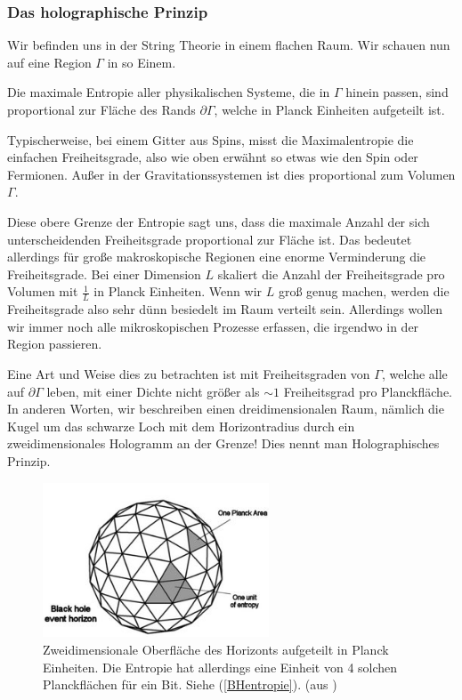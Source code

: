 \documentclass[ngerman]{scrartcl}
\begin{document}
	\subsubsection{Das holographische Prinzip}
	Wir befinden uns in der String Theorie in einem flachen Raum. Wir schauen nun auf eine Region $\Gamma$ in so Einem. 
	
	Die maximale Entropie aller physikalischen Systeme, die in $\Gamma$ hinein passen, sind proportional zur Fläche des Rands $\partial \Gamma$, welche in Planck Einheiten aufgeteilt ist. 
	
	Typischerweise, bei einem Gitter aus Spins, misst die Maximalentropie die einfachen Freiheitsgrade, also wie oben erwähnt so etwas wie den Spin oder Fermionen. Außer in der Gravitationssystemen ist dies proportional zum Volumen $\Gamma$. 
	
	Diese obere Grenze der Entropie sagt uns, dass die maximale Anzahl der sich unterscheidenden Freiheitsgrade proportional zur Fläche ist. Das bedeutet allerdings für große makroskopische Regionen eine enorme Verminderung die Freiheitsgrade. Bei einer Dimension $L$ skaliert die Anzahl der Freiheitsgrade pro Volumen mit $\frac{1}{L}$ in Planck Einheiten.
	Wenn wir $L$ groß genug machen, werden die Freiheitsgrade also sehr dünn besiedelt im Raum verteilt sein. Allerdings wollen wir immer noch alle mikroskopischen Prozesse erfassen, die irgendwo in der Region passieren. 
	
	Eine Art und Weise dies zu betrachten ist mit Freiheitsgraden von $\Gamma$, welche alle auf $\partial \Gamma$ leben, mit einer Dichte nicht größer als $\sim 1$ Freiheitsgrad pro Planckfläche. In anderen Worten, wir beschreiben einen dreidimensionalen Raum, nämlich die Kugel um das schwarze Loch mit dem Horizontradius durch ein zweidimensionales Hologramm an der Grenze! Dies nennt man Holographisches Prinzip. 
	
	\begin{figure} 
		\begin{center}
			\includegraphics[width=0.6\textwidth]{BHentropy1}
		\end{center}
		\caption{Zweidimensionale Oberfläche des Horizonts aufgeteilt in Planck Einheiten. Die Entropie hat allerdings eine Einheit von 4 solchen Planckflächen für ein Bit. Siehe (\ref{BHentropie}). (aus \cite{BekensteinHawking})}
	\end{figure} 
\end{document}
